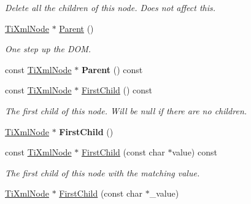 \begin{DoxyCompactItemize}
\begin{DoxyCompactList}\small\item\em Delete all the children of this node. Does not affect \textquotesingle{}this\textquotesingle{}. \end{DoxyCompactList}\item 
\hyperlink{class_ti_xml_node}{Ti\+Xml\+Node} $\ast$ \hyperlink{class_ti_xml_node_ab643043132ffd794f8602685d34a982e}{Parent} ()\hypertarget{class_ti_xml_node_ab643043132ffd794f8602685d34a982e}{}\label{class_ti_xml_node_ab643043132ffd794f8602685d34a982e}

\begin{DoxyCompactList}\small\item\em One step up the D\+OM. \end{DoxyCompactList}\item 
const \hyperlink{class_ti_xml_node}{Ti\+Xml\+Node} $\ast$ {\bfseries Parent} () const \hypertarget{class_ti_xml_node_a78878709e53066f06eb4fcbcdd3a5260}{}\label{class_ti_xml_node_a78878709e53066f06eb4fcbcdd3a5260}

\item 
const \hyperlink{class_ti_xml_node}{Ti\+Xml\+Node} $\ast$ \hyperlink{class_ti_xml_node_a44c8eee26bbe2d1b2762038df9dde2f0}{First\+Child} () const \hypertarget{class_ti_xml_node_a44c8eee26bbe2d1b2762038df9dde2f0}{}\label{class_ti_xml_node_a44c8eee26bbe2d1b2762038df9dde2f0}

\begin{DoxyCompactList}\small\item\em The first child of this node. Will be null if there are no children. \end{DoxyCompactList}\item 
\hyperlink{class_ti_xml_node}{Ti\+Xml\+Node} $\ast$ {\bfseries First\+Child} ()\hypertarget{class_ti_xml_node_a5e97d69b7c0ebd27fb7286be56559b77}{}\label{class_ti_xml_node_a5e97d69b7c0ebd27fb7286be56559b77}

\item 
const \hyperlink{class_ti_xml_node}{Ti\+Xml\+Node} $\ast$ \hyperlink{class_ti_xml_node_ab5f722624113c8203227de4f56576d31}{First\+Child} (const char $\ast$value) const 
\begin{DoxyCompactList}\small\item\em The first child of this node with the matching \textquotesingle{}value\textquotesingle{}. \end{DoxyCompactList}\item 
\hyperlink{class_ti_xml_node}{Ti\+Xml\+Node} $\ast$ \hyperlink{class_ti_xml_node_abc8bf32be6419ec453a731868de19554}{First\+Child} (const char $\ast$\+\_\+value)\hypertarget{class_ti_xml_node_abc8bf32be6419ec453a731868de19554}{}\label{class_ti_xml_node_abc8bf32be6419ec453a731868de19554}


\end{DoxyCompactItemize}
